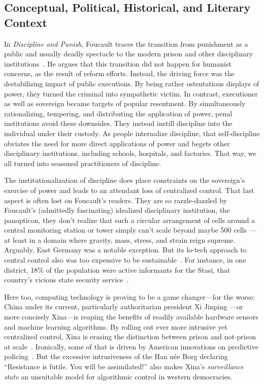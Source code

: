 \subsection{Conceptual, Political, Historical, and Literary Context}
\label{sec:context}

In \emph{Discipline and Punish}, Foucault traces the transition from punishment
as a public and usually deadly spectacle to the modern prison and other
disciplinary institutions~\cite{Foucault1979}. He argues that this transition
did not happen for humanist concerns, as the result of reform efforts. Instead,
the driving force was the destabilizing impact of public executions. By being
rather ostentatious displays of power, they turned the criminal into sympathetic
victim. In contrast, executioner as well as sovereign became targets of popular
resentment. By simultaneously rationalizing, tempering, and distributing the
application of power, penal institutions avoid these downsides. They instead
instill discipline into the individual under their custody. As people
internalize discipline, that self-discipline obviates the need for more direct
applications of power and begets other disciplinary institutions, including
schools, hospitals, and factories. That way, we all turned into seasoned
practitioners of discipline.

The institutionalization of discipline does place constraints on the sovereign's
exercise of power and leads to an attendant loss of centralized control. That
last aspect is often lost on Foucault's readers. They are so razzle-dazzled by
Foucault's (admittedly fascinating) idealized disciplinary institution, the
panopticon, they don't realize that such a circular arrangement of cells around
a central monitoring station or tower simply can't scale beyond maybe 500 cells%
---at least in a domain where gravity, mass, stress, and strain reign supreme.
Arguably, East Germany was a notable exception. But its lo-tech approach to
central control also was too expensive to be sustainable~\cite{Schroeder2013}.
For instance, in one district, 18\% of the population were active informants for
the Stasi, that country's vicious state security service~\cite{Kellerhoff2022}.

Here too, computing technology is proving to be a game changer---for the
worse: China under its current, particularly authoritarian president Xi Jinping%
---or more concisely Xina---is reaping the benefits of readily available
hardware sensors and machine learning algorithms. By rolling out ever more
intrusive yet centralized control, Xina is erasing the distinction between
prison and not-prison at scale~\cite{Grauer2021,MozurXiaoea2022,SmithIV2016}.
Ironically, some of that is driven by American innovations on predictive
policing~\cite{PerryMcInnisea2013,SmithIV2016,Sprick2019}. But the excessive
intrusiveness of the Han n\'ee Borg declaring ``Resistance is futile. You will
be assimilated!'' also makes Xina's \emph{surveillance state} an unsuitable
model for algorithmic control in western democracies.

